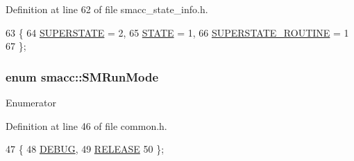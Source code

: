 Definition at line 62 of file smacc\+\_\+state\+\_\+info.\+h.


\begin{DoxyCode}
63 \{
64     \hyperlink{namespacesmacc_a63f5f7aae7e563619d0886fca83612cca4da54a31b31f1c863864fdee05fc35c8}{SUPERSTATE} = 2,
65     \hyperlink{namespacesmacc_a63f5f7aae7e563619d0886fca83612cca2b848a8cc886d253d21a77c43cd50aae}{STATE} = 1,
66     \hyperlink{namespacesmacc_a63f5f7aae7e563619d0886fca83612cca6d39c20504d2f2afe9c8c27351e61d20}{SUPERSTATE\_ROUTINE} = 1
67 \};
\end{DoxyCode}
\subsubsection[{\texorpdfstring{S\+M\+Run\+Mode}{SMRunMode}}]{\setlength{\rightskip}{0pt plus 5cm}enum {\bf smacc\+::\+S\+M\+Run\+Mode}\hspace{0.3cm}{\ttfamily [strong]}}\hypertarget{namespacesmacc_a3e4f79486ea6ea6342dd3c712d16a4f6}{}\label{namespacesmacc_a3e4f79486ea6ea6342dd3c712d16a4f6}
\begin{Desc}
\item[Enumerator]\par
\begin{description}
\item[{\em 
D\+E\+B\+UG\hypertarget{namespacesmacc_a3e4f79486ea6ea6342dd3c712d16a4f6adc30ec20708ef7b0f641ef78b7880a15}{}\label{namespacesmacc_a3e4f79486ea6ea6342dd3c712d16a4f6adc30ec20708ef7b0f641ef78b7880a15}
}]\item[{\em 
R\+E\+L\+E\+A\+SE\hypertarget{namespacesmacc_a3e4f79486ea6ea6342dd3c712d16a4f6a7d649ef069df9885e382417c79f3d5cd}{}\label{namespacesmacc_a3e4f79486ea6ea6342dd3c712d16a4f6a7d649ef069df9885e382417c79f3d5cd}
}]\end{description}
\end{Desc}


Definition at line 46 of file common.\+h.


\begin{DoxyCode}
47 \{
48   \hyperlink{namespacesmacc_a3e4f79486ea6ea6342dd3c712d16a4f6adc30ec20708ef7b0f641ef78b7880a15}{DEBUG},
49   \hyperlink{namespacesmacc_a3e4f79486ea6ea6342dd3c712d16a4f6a7d649ef069df9885e382417c79f3d5cd}{RELEASE}
50 \};
\end{DoxyCode}


